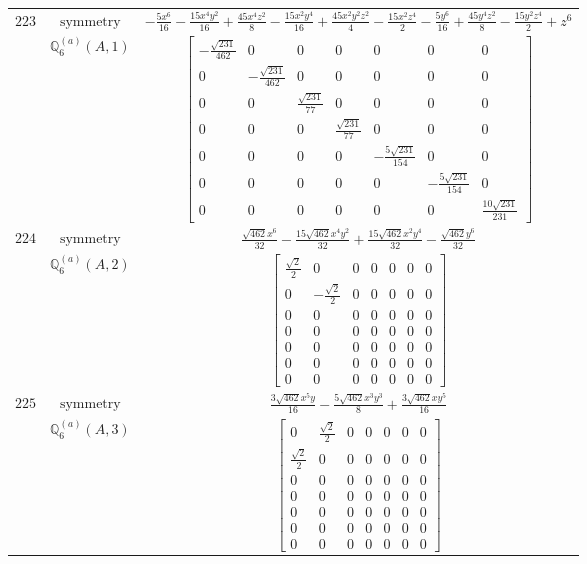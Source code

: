 \documentclass[fleqn,8pt,landscape]{jsarticle}
\begin{document}
\begin{longtable}{ccc}
$ 223 $ & $ \text{symmetry} $ & $ - \frac{5 x^{6}}{16} - \frac{15 x^{4} y^{2}}{16} + \frac{45 x^{4} z^{2}}{8} - \frac{15 x^{2} y^{4}}{16} + \frac{45 x^{2} y^{2} z^{2}}{4} - \frac{15 x^{2} z^{4}}{2} - \frac{5 y^{6}}{16} + \frac{45 y^{4} z^{2}}{8} - \frac{15 y^{2} z^{4}}{2} + z^{6} $ \\
$  $ & $ \mathbb{Q}_{6}^{(a)}(A,1) $ & $ \begin{bmatrix} - \frac{\sqrt{231}}{462} & 0 & 0 & 0 & 0 & 0 & 0 \\ 0 & - \frac{\sqrt{231}}{462} & 0 & 0 & 0 & 0 & 0 \\ 0 & 0 & \frac{\sqrt{231}}{77} & 0 & 0 & 0 & 0 \\ 0 & 0 & 0 & \frac{\sqrt{231}}{77} & 0 & 0 & 0 \\ 0 & 0 & 0 & 0 & - \frac{5 \sqrt{231}}{154} & 0 & 0 \\ 0 & 0 & 0 & 0 & 0 & - \frac{5 \sqrt{231}}{154} & 0 \\ 0 & 0 & 0 & 0 & 0 & 0 & \frac{10 \sqrt{231}}{231} \end{bmatrix} $ \\ \hline
$ 224 $ & $ \text{symmetry} $ & $ \frac{\sqrt{462} x^{6}}{32} - \frac{15 \sqrt{462} x^{4} y^{2}}{32} + \frac{15 \sqrt{462} x^{2} y^{4}}{32} - \frac{\sqrt{462} y^{6}}{32} $ \\
$  $ & $ \mathbb{Q}_{6}^{(a)}(A,2) $ & $ \begin{bmatrix} \frac{\sqrt{2}}{2} & 0 & 0 & 0 & 0 & 0 & 0 \\ 0 & - \frac{\sqrt{2}}{2} & 0 & 0 & 0 & 0 & 0 \\ 0 & 0 & 0 & 0 & 0 & 0 & 0 \\ 0 & 0 & 0 & 0 & 0 & 0 & 0 \\ 0 & 0 & 0 & 0 & 0 & 0 & 0 \\ 0 & 0 & 0 & 0 & 0 & 0 & 0 \\ 0 & 0 & 0 & 0 & 0 & 0 & 0 \end{bmatrix} $ \\ \hline
$ 225 $ & $ \text{symmetry} $ & $ \frac{3 \sqrt{462} x^{5} y}{16} - \frac{5 \sqrt{462} x^{3} y^{3}}{8} + \frac{3 \sqrt{462} x y^{5}}{16} $ \\
$  $ & $ \mathbb{Q}_{6}^{(a)}(A,3) $ & $ \begin{bmatrix} 0 & \frac{\sqrt{2}}{2} & 0 & 0 & 0 & 0 & 0 \\ \frac{\sqrt{2}}{2} & 0 & 0 & 0 & 0 & 0 & 0 \\ 0 & 0 & 0 & 0 & 0 & 0 & 0 \\ 0 & 0 & 0 & 0 & 0 & 0 & 0 \\ 0 & 0 & 0 & 0 & 0 & 0 & 0 \\ 0 & 0 & 0 & 0 & 0 & 0 & 0 \\ 0 & 0 & 0 & 0 & 0 & 0 & 0 \end{bmatrix} $ \\ \hline

\end{longtable}
\end{document}
